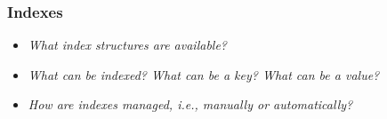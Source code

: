 
\begin{frame}
\frametitle{Indexes}
\begin{itemize}
\item \emph{What index structures are available?}
\item \emph{What can be indexed? What can be a key? What can be a value?}
\item \emph{How are indexes managed, i.e., manually or automatically?}
\end{itemize}
\end{frame} 